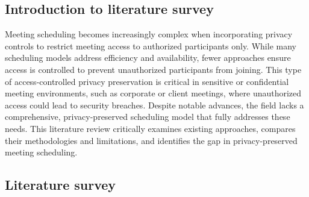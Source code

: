 \begin{spacing}{1.0}
    \subsection{Introduction to literature survey}
    \indent \indent Meeting scheduling becomes increasingly complex when incorporating privacy controls to restrict meeting access to authorized participants only. While many scheduling models address efficiency and availability, fewer approaches ensure access is controlled to prevent unauthorized participants from joining. This type of access-controlled privacy preservation is critical in sensitive or confidential meeting environments, such as corporate or client meetings, where unauthorized access could lead to security breaches. Despite notable advances, the field lacks a comprehensive, privacy-preserved scheduling model that fully addresses these needs. This literature review critically examines existing approaches, compares their methodologies and limitations, and identifies the gap in privacy-preserved meeting scheduling.
    
    \subsection{Literature survey}

\end{spacing}
